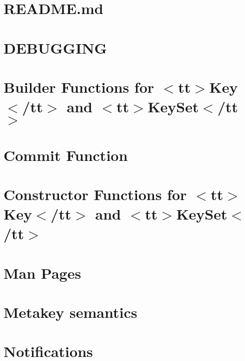 \let\mypdfximage\pdfximage\def\pdfximage{\immediate\mypdfximage}\documentclass[twoside]{book}
\newcommand{\+}{\discretionary{\mbox{\scriptsize$\hookleftarrow$}}{}{}}
\begin{document}
\chapter{README.\+md}
\label{doc_contrib_README_md}

\chapter{DEBUGGING}
\label{doc_DEBUGGING_md}

\chapter{Builder Functions for $<$tt$>$Key$<$/tt$>$ and $<$tt$>$Key\+Set$<$/tt$>$}
\label{doc_decisions_0_drafts_builder_functions_md}

\chapter{Commit Function}
\label{doc_decisions_0_drafts_commit_function_md}

\chapter{Constructor Functions for $<$tt$>$Key$<$/tt$>$ and $<$tt$>$Key\+Set$<$/tt$>$}
\label{doc_decisions_0_drafts_constructor_functions_md}

\chapter{Man Pages}
\label{doc_decisions_0_drafts_man_pages_md}

\chapter{Metakey semantics}
\label{doc_decisions_0_drafts_metakey_semantics_md}

\chapter{Notifications}
\label{doc_decisions_0_drafts_notifications_md}

\end{document}
